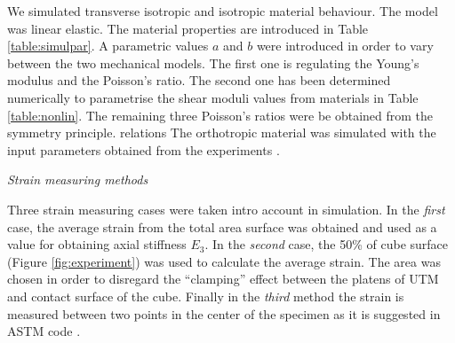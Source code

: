 \documentclass[review]{elsarticle}
\begin{document}
We simulated transverse isotropic and isotropic material behaviour.
The model was linear elastic. The material properties are introduced in
Table \ref{table:simulpar}. A parametric values $a$ and $b$ were introduced in
order to vary between the two mechanical models. The first one is regulating
the Young's modulus and the Poisson's ratio. The second one has
been determined numerically to parametrise the shear moduli values from
materials in Table \ref{table:nonlin}. 
The remaining three Poisson's ratios were be obtained from the symmetry
principle. relations The orthotropic material was simulated with the input
parameters obtained from the experiments \cite{vorobyevcharacterisation}.


\begin{description}
\item{\textit{Strain measuring methods}}
\end{description}

Three strain measuring cases were taken intro account in simulation.
In the \textit{first} case,  the average strain from the total area surface was
obtained and used as a value for obtaining axial stiffness $E_3$. In the
\textit{second} case, the 50\% of cube surface (Figure \ref{fig:experiment}) was used to calculate the
 average strain. The area was chosen in order to disregard the ``clamping''
 effect between the platens of UTM and contact surface of the cube. Finally in
 the \textit{third} method the strain is measured between two points in the center of the specimen as it is suggested in ASTM code \cite{american2009standard}.
\end{document}
